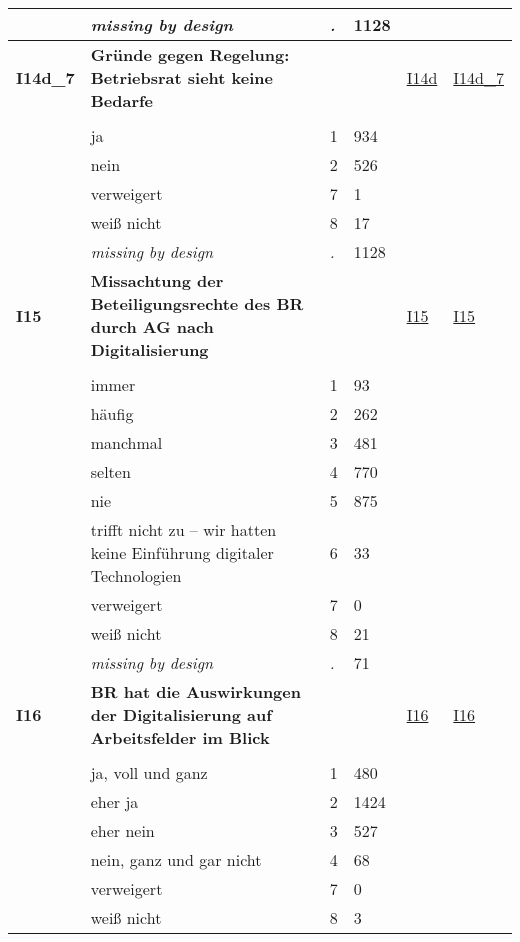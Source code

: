 \begin{longtable}{| L{2.45cm} | L{6cm} | C{1.5cm} | R{1cm} | C{2.25cm} | C{2.25cm} |}
   & \textit{missing by design} & \textit{.} & 1128 &  &  \\ 
   \midrule
\textbf{I14d\_7}\label{var:I14d:7} & \textbf{Gründe gegen Regelung: Betriebsrat sieht keine Bedarfe} &  &  & \hyperref[I14d]{I14d} & \hyperref[var:suf:I14d:7]{I14d\_7} \\ 
   &  &  &  &  &  \\ 
   & ja & 1 & 934 &  &  \\ 
   & nein & 2 & 526 &  &  \\ 
   & verweigert & 7 & 1 &  &  \\ 
   & weiß nicht & 8 & 17 &  &  \\ 
   & \textit{missing by design} & \textit{.} & 1128 &  &  \\ 
   \midrule
\textbf{I15}\label{var:I15} & \textbf{Missachtung der Beteiligungsrechte des BR durch AG nach Digitalisierung} &  &  & \hyperref[I15]{I15} & \hyperref[var:suf:I15]{I15} \\ 
   &  &  &  &  &  \\ 
   & immer & 1 & 93 &  &  \\ 
   & häufig & 2 & 262 &  &  \\ 
   & manchmal & 3 & 481 &  &  \\ 
   & selten & 4 & 770 &  &  \\ 
   & nie & 5 & 875 &  &  \\ 
   & trifft nicht zu – wir hatten keine Einführung digitaler Technologien & 6 & 33 &  &  \\ 
   & verweigert & 7 & 0 &  &  \\ 
   & weiß nicht & 8 & 21 &  &  \\ 
   & \textit{missing by design} & \textit{.} & 71 &  &  \\ 
   \midrule
\textbf{I16}\label{var:I16} & \textbf{BR hat die Auswirkungen der Digitalisierung auf Arbeitsfelder im Blick} &  &  & \hyperref[I16]{I16} & \hyperref[var:suf:I16]{I16} \\ 
   &  &  &  &  &  \\ 
   & ja, voll und ganz & 1 & 480 &  &  \\ 
   & eher ja & 2 & 1424 &  &  \\ 
   & eher nein & 3 & 527 &  &  \\ 
   & nein, ganz und gar nicht & 4 & 68 &  &  \\ 
   & verweigert & 7 & 0 &  &  \\ 
   & weiß nicht & 8 & 3 &  &  \\ 

\end{longtable}
